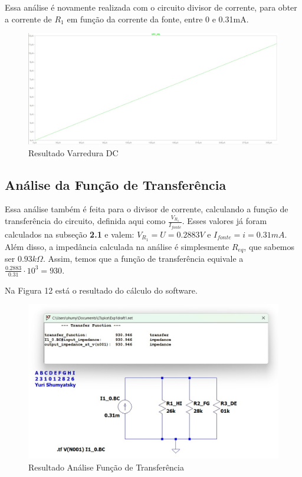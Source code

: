 \documentclass[10pt,twocolumn,letterpaper]{article}
\begin{document}
Essa análise é novamente realizada com o circuito divisor de corrente, para obter a corrente de $R_1$ em função da corrente da fonte, entre 0 e 0.31mA.

\begin{figure}[h]
\caption{Resultado Varredura DC}
\includegraphics[scale=0.15]{figuras/fig11}
\end{figure}

\subsection{Análise da Função de Transferência}

Essa análise também é feita para o divisor de corrente, calculando a função de transferência do circuito, definida aqui como $\frac{V_{R_1}}{I_{fonte}}$. Esses valores já foram calculados na subseção \textbf{2.1} e valem: $V_{R_1} = U = 0.2883V$ e $I_{fonte} = i = 0.31mA$. Além disso, a impedância calculada na análise é simplesmente $R_{eq}$, que sabemos ser $0.93k\Omega$. Assim, temos que a função de transferência equivale a $\frac{0.2883}{0.31}\cdot10^3=930$.

Na Figura 12 está o resultado do cálculo do software. 

\begin{figure}[h]
\caption{Resultado Análise Função de Transferência}
\includegraphics[scale=0.2]{figuras/fig12}
\end{figure}
\end{document}
